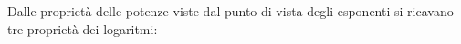 Dalle proprietà delle potenze viste dal punto di vista degli 
esponenti si ricavano tre proprietà dei logaritmi:
% 

